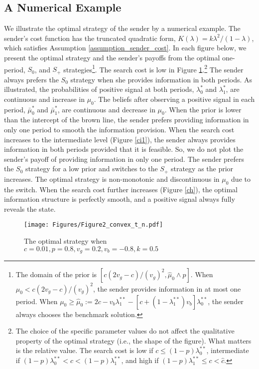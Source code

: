 \documentclass[11pt]{extarticle}
\newcommand{\m}{\wedge}
\begin{document}
\subsection{A Numerical Example}
We illustrate the optimal strategy of the sender by a numerical example. The sender's cost function has the truncated quadratic form, $K(\lambda) = k\lambda^2/ (1-\lambda)$, which satisfies Assumption \ref{assumption_sender_cost}. In each figure below, we present the optimal strategy and the sender's payoffs from the optimal one-period, $S_0$, and $S_+$ strategies\footnote{The domain of the prior is $[c(2v_g-c)/(v_g)^2,\widehat{\mu}_0\m p]$. When $\mu_0 < c(2v_g-c)/(v_g)^2$, the sender provides information in at most one period. When $\mu_0 \geq \widehat{\mu}_0 := 2c-v_b\lambda_1^{**}-[c+(1-\lambda_1^{**})v_b]\lambda_0^{**}$, the sender always chooses the benchmark solution.}. The search cost is low in Figure \ref{cs1}.\footnote{The choice of the specific parameter values do not affect the qualitative property of the optimal strategy (i.e., the shape of the figure). What matters is the relative value. The search cost is low if $c \leq (1-p) \lambda_0^{**}$, intermediate if $(1-p) \lambda_0^{**} < c < (1-p) \lambda_1^{**}$, and high if $(1-p) \lambda_1^{**} \leq c < \widehat{c}$.} The sender always prefers the $S_0$ strategy when she provides information in both periods. As illustrated, the probabilities of positive signal at both periods, $\lambda_0^*$ and $\lambda_1^*$, are continuous and increase in $\mu_0$. The beliefs after observing a positive signal in each period, $\bar{\mu}_0^*$ and $\bar{\mu}_1^*$, are continuous and decrease in $\mu_0$. When the prior is lower than the intercept of the brown line, the sender prefers providing information in only one period to smooth the information provision. When the search cost increases to the intermediate level (Figure \ref{ci1}), the sender always provides information in both periods provided that it is feasible. So, we do not plot the sender's payoff of providing information in only one period. The sender prefers the $S_0$ strategy for a low prior and switches to the $S_+$ strategy as the prior increases. The optimal strategy is non-monotonic and discontinuous in $\mu_0$ due to the switch. When the search cost further increases (Figure \ref{ch}), the optimal information structure is perfectly smooth, and a positive signal always fully reveals the state.


\begin{figure}[H]
	\centering
	\texttt{[image: Figures/Figure2\_convex\_t\_n.pdf]}
	\caption{The optimal strategy when $c = 0.01, p = 0.8, v_g = 0.2, v_b = -0.8, k = 0.5$}\label{cs1}
\end{figure}
\end{document}
